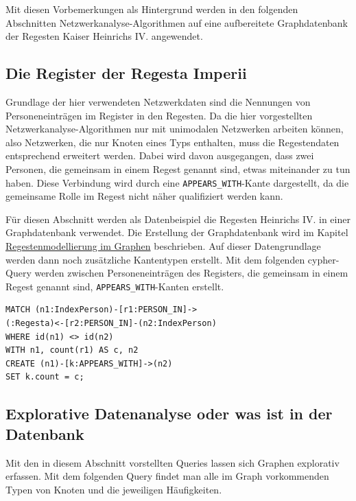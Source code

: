 Mit diesen Vorbemerkungen als Hintergrund werden in den folgenden
Abschnitten Netzwerkanalyse-Algorithmen auf eine aufbereitete
Graphdatenbank der Regesten Kaiser Heinrichs IV. angewendet.

\hypertarget{die-register-der-regesta-imperii}{%
\subsection{Die Register der Regesta
Imperii}\label{die-register-der-regesta-imperii}}

Grundlage der hier verwendeten Netzwerkdaten sind die Nennungen von
Personeneinträgen im Register in den Regesten. Da die hier vorgestellten
Netzwerkanalyse-Algorithmen nur mit unimodalen Netzwerken arbeiten
können, also Netzwerken, die nur Knoten eines Typs enthalten, muss die
Regestendaten entsprechend erweitert werden. Dabei wird davon
ausgegangen, dass zwei Personen, die gemeinsam in einem Regest genannt
sind, etwas miteinander zu tun haben. Diese Verbindung wird durch eine
\texttt{APPEARS\_WITH}-Kante dargestellt, da die gemeinsame Rolle im
Regest nicht näher qualifiziert werden kann.

Für diesen Abschnitt werden als Datenbeispiel die Regesten Heinrichs IV.
in einer Graphdatenbank verwendet. Die Erstellung der Graphdatenbank
wird im Kapitel
\href{20_Regestenmodellierung-im-Graphen.md}{Regestenmodellierung im
Graphen} beschrieben. Auf dieser Datengrundlage werden dann noch
zusätzliche Kantentypen erstellt. Mit dem folgenden cypher-Query werden
zwischen Personeneinträgen des Registers, die gemeinsam in einem Regest
genannt sind, \texttt{APPEARS\_WITH}-Kanten erstellt.

\begin{verbatim}
MATCH (n1:IndexPerson)-[r1:PERSON_IN]->
(:Regesta)<-[r2:PERSON_IN]-(n2:IndexPerson)
WHERE id(n1) <> id(n2)
WITH n1, count(r1) AS c, n2
CREATE (n1)-[k:APPEARS_WITH]->(n2)
SET k.count = c;
\end{verbatim}

\hypertarget{explorative-datenanalyse-oder-was-ist-in-der-datenbank}{%
\subsection{Explorative Datenanalyse oder was ist in der
Datenbank}\label{explorative-datenanalyse-oder-was-ist-in-der-datenbank}}

Mit den in diesem Abschnitt vorstellten Queries lassen sich Graphen
explorativ erfassen. Mit dem folgenden Query findet man alle im Graph
vorkommenden Typen von Knoten und die jeweiligen Häufigkeiten.

